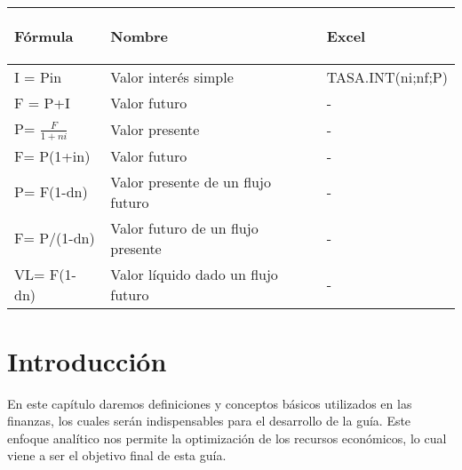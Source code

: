 \begin{spacing}{1.5}
	\begin{center}
		\begin{tabular}{ |p{6cm}|p{5cm}| p{4cm}|}
			\hline
			\rowcolor{orange!50}
			\begin{center}\textbf{Fórmula} \end{center} & \begin{center} \textbf{Nombre}\end{center}          & \begin{center} \textbf{Excel} \end{center} \\ \hline
			
			I = Pin                   & Valor interés simple               & TASA.INT(ni;nf;P)         \\ \hline
			
			F = P+I                   & Valor futuro                       & -                         \\ \hline
			
			P= $\frac{F}{1+ni }$      & Valor presente                     & -                         \\ \hline
			
			
			F= P(1+in)                & Valor futuro                       & -                         \\ \hline
			
			P= F(1-dn)                & Valor presente de un flujo futuro  & -                         \\ \hline
			
			F= P/(1-dn)               & Valor futuro de un flujo presente  & -                         \\ \hline
			
			VL= F(1-dn)               & Valor líquido dado un flujo futuro & -                         \\ \hline
		\end{tabular}
	\end{center}
\end{spacing}

\section{Introducción}
En este capítulo daremos definiciones y conceptos básicos utilizados en las finanzas, los cuales serán indispensables para el desarrollo de la guía. Este enfoque analítico nos permite la optimización de los recursos económicos, lo cual viene a ser el objetivo final de esta guía.

